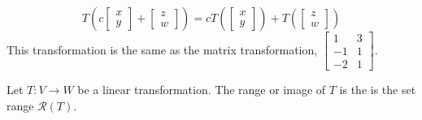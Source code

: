 \begin{ex}
\[T(c\begin{bmatrix}x\\y\end{bmatrix}+\begin{bmatrix}z\\w\end{bmatrix})=cT(\begin{bmatrix}x\\y\end{bmatrix})+T(\begin{bmatrix}z\\w\end{bmatrix})\]
This transformation is the same as the matrix transformation, $\begin{bmatrix}1 & 3\\ -1 & 1\\ -2 & 1\end{bmatrix}$.
\end{ex}

\begin{defn}
Let $T: V\to W$ be a linear transformation. The range or image of $T$ is the is the set range $\mathscr{R}(T)$.

\end{defn}